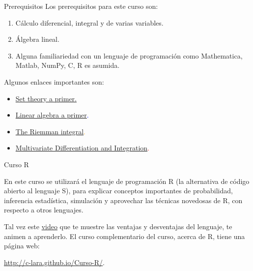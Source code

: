 \documentclass{beamer}
\begin{document}
 \begin{frame}{Prerequisitos}
Los prerequisitos para este curso son:

\begin{enumerate}
 
 \item C\'alculo diferencial, integral y de varias variables.
 
 \item \'Algebra lineal.
 
 \item  Alguna familiariedad con un lenguaje de programaci\'on como Mathematica, Matlab, NumPy, C, R es asumida.
 
\end{enumerate}
 \vspace{0.5cm}
 
 Algunos enlaces importantes son:
 
 \begin{itemize}
 
\item \scriptsize{ \textcolor{brown}{\href{https://jeremykun.com/2011/07/09/set-theory-a-primer/}{Set theory a primer.}}}
 
\item \scriptsize{ \textcolor{blue}{\href{https://jeremykun.com/2011/06/19/linear-algebra-a-primer/}{Linear algebra a primer}.}}
 
\item \scriptsize{ \textcolor{orange}{\href{https://www.countbayesie.com/blog/2015/8/3/the-riemann-integral}{The Riemman integral}.}}
    
\item \scriptsize{ \textcolor{red}{\href{http://theanalysisofdata.com/probability/F_6.html}{Multivariate Differentiation and Integration}.}}
\end{itemize}
 \end{frame}
 \begin{frame}{Curso R}

 En este curso se utilizar\'a el lenguaje de programaci\'on  R (la alternativa de c\'odigo abierto al lenguaje  S), para explicar conceptos importantes de probabilidad, inferencia estad\'istica, simulaci\'on y aprovechar las t\'ecnicas novedosas de R, con respecto a otros lenguajes. 
 
 Tal vez este \textcolor{red}{\href{https://www.youtube.com/watch?v=Dx4IFguczgI}{video}} que te muestre las ventajas y desventajas del lenguaje, te animen a aprenderlo. El curso complementario del curso, acerca de R, tiene una p\'agina web:
 
  \textcolor{blue}{\url{http://c-lara.github.io/Curso-R/}}.
 

\end{frame}
\end{document}
